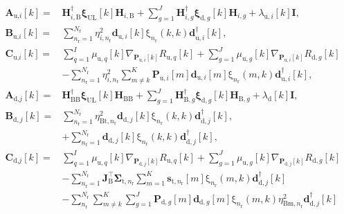 \documentclass[10pt,journal]{IEEEtran}
\newcommand{\paren}[1]{\left({#1}\right)}
\newcommand{\bracket}[1]{{\left [{#1}\right ]}}
\newcommand{\rr}{_\mathrm{r}}
\newcommand{\B}{\textrm{B}}
\newcommand{\target}{\mathrm{t}}
\newcommand{\sigmanr}{\boldsymbol{\Sigma}_{\textrm{t},n\rr}}
\newcommand{\dBjone}{\mathbf{d}_{\textrm{d},j}\bracket{k}}
\newcommand{\dBjoneH}{\mathbf{d}^\dagger_{\textrm{d},j}\bracket{k}}
\newcommand{\dBjn}{\mathbf{d}_{\textrm{d},j}\bracket{k}}
\newcommand{\PiB}{\mathbf{P}_{\textrm{u},i}\bracket{k}}
\newcommand{\PBj}{\mathbf{P}_{\textrm{d},j}\bracket{k}}
\newcommand{\HBB}{\mathbf{H}_{\mathrm{BB}}}
\newcommand{\HBBH}{\mathbf{H}^\dagger_{\mathrm{BB}}}
\newcommand{\HiBH}{\mathbf{H}^\dagger_{i,\textrm{B}}}
\theoremstyle{definition}
\begin{document}
\begin{subequations}
\begin{align}
\mathbf{A}_{\textrm{u,}i}\bracket{k}=&\HiBH\boldsymbol{\xi}_{\textrm{UL}}\bracket{k}\mathbf{H}_{i,\B}+\sum_{g=1}^\mathit{J}\mathbf{H}^\dagger_{i,g}\boldsymbol{\xi}_{\textrm{d},g}\bracket{k}\mathbf{H}_{i,g}+\lambda_{\textrm{u},i}\bracket{k}\mathbf{I},\nonumber\\
\mathbf{B}_{\textrm{u,}i}\bracket{k} =& \sum_{n\rr=1}^{\mathit{N}\rr}\eta^2_{i,n\rr}\mathbf{d}_{\textrm{u},i}\bracket{k}\mathrm{\xi}_{n\rr}\paren{k,k}\mathbf{d}^\dagger_{\textrm{u},i}\bracket{k},\nonumber\\
\mathbf{C}_{\textrm{u,}i}\bracket{k}=& \sum_{q=1}^{\mathit{I}}\mu_{\textrm{u},q}\bracket{k}\nabla_{\PiB}\mathit{R}_{\textrm{u},q}\bracket{k}+\sum_{g=1}^{J}\mu_{\textrm{u},g}\bracket{k}\nabla_{\PiB}\mathit{R}_{\textrm{d},g}\bracket{k}\nonumber\\
&-\sum_{n\rr=1}^{\mathit{N}\rr}\eta^2_{i,n\rr}\sum_{m\neq k}^{\mathrm{\mathit{K}}}\mathbf{P}_{\textrm{u},i}\bracket{m}\mathbf{d}_{\textrm{u},i}\bracket{m}\mathrm{\xi}_{n\rr}\paren{m,k}\mathbf{d}^\dagger_{\textrm{u},i}\bracket{k},\nonumber\\
\mathbf{A}_{\textrm{d,}j}\bracket{k}=&\HBBH\boldsymbol{\xi}_{\textrm{UL}}\bracket{k}\HBB+\sum_{g=1}^{\mathit{J}}\mathbf{H}^\dagger_{\B,g}\boldsymbol{\xi}_{\textrm{d},g}\bracket{k}\mathbf{H}_{\B,g}+\lambda_\textrm{d}\bracket{k}\mathbf{I},\nonumber\\
\mathbf{B}_{\textrm{d},j}\bracket{k}=&\sum_{n\rr=1}^{\mathit{N}\rr}\eta^2_{\textrm{Bt},n\rr}\dBjone\mathrm{\xi}_{n\rr}\paren{k,k}\dBjoneH,\nonumber\\
&+\sum_{n\rr=1}^{\mathit{N}\rr}\dBjn\mathrm{\xi}_{n\rr}\paren{k,k}\mathbf{d}^\dagger_{\textrm{d},j}\bracket{k},\nonumber\\
\mathbf{C}_{\textrm{d,}j}\bracket{k}=& \sum_{q=1}^{\mathit{I}}\mu_{\textrm{u},q}\bracket{k}\nabla_{\PBj}\mathit{R}_{\textrm{u},q}\bracket{k}+\sum_{g=1}^{\mathit{J}}\mu_{\textrm{u},g}\bracket{k}\nabla_{\PBj}\mathit{R}_{\textrm{d},g}\bracket{k}\nonumber\\
&-\sum_{n\rr=1}^{\mathit{N}\rr}\mathbf{J}^\top_{\textrm{B}}\sigmanr\sum_{m=1}^{\mathrm{\mathit{K}}}\mathbf{s}_{\target,n\rr}\bracket{m}\mathrm{\xi}_{n\rr}\paren{m,k}\mathbf{d}^\dagger_{\textrm{d},j}\bracket{k}\nonumber\\
&-\sum_{n\rr}^{\mathit{N}\rr}\sum_{m\neq k}^{\mathrm{\mathit{K}}}\sum_{g=1}^{\mathit{J}}\mathbf{P}_{\textrm{d},g}\bracket{m}\mathbf{d}_{\textrm{d},g}\bracket{m}\mathrm{\xi}_{n\rr}\paren{m,k}\eta^2_{\textrm{Bm},n\rr}\mathbf{d}^\dagger_{\textrm{d},j}\bracket{k}\nonumber\\

\end{align}
\end{subequations}
\end{document}
